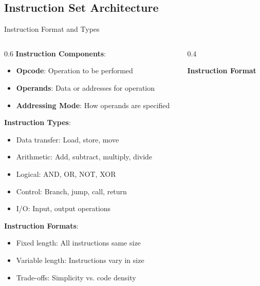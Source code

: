 \documentclass[aspectratio=169]{beamer}
\newcommand{\concept}[1]{\textbf{\color{darkblue}#1}}
\begin{document}
\subsection{Instruction Set Architecture}

\begin{frame}{Instruction Format and Types}
\begin{columns}
\begin{column}{0.6\textwidth}
\concept{Instruction Components}:
\begin{itemize}
\item \textbf{Opcode}: Operation to be performed
\item \textbf{Operands}: Data or addresses for operation
\item \textbf{Addressing Mode}: How operands are specified
\end{itemize}

\vspace{0.3cm}
\concept{Instruction Types}:
\begin{itemize}
\item Data transfer: Load, store, move
\item Arithmetic: Add, subtract, multiply, divide
\item Logical: AND, OR, NOT, XOR
\item Control: Branch, jump, call, return
\item I/O: Input, output operations
\end{itemize}

\vspace{0.3cm}
\concept{Instruction Formats}:
\begin{itemize}
\item Fixed length: All instructions same size
\item Variable length: Instructions vary in size
\item Trade-offs: Simplicity vs. code density
\end{itemize}
\end{column}
\begin{column}{0.4\textwidth}
\begin{center}
\textbf{Instruction Format}
\vspace{0.3cm}

\end{center}
\end{column}
\end{columns}
\end{frame}
\end{document}
